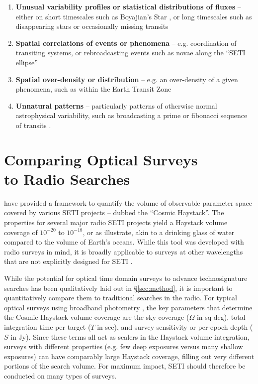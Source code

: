 \documentclass[twocolumn]{aastex62}
\begin{document}
\begin{enumerate}
\item {\bf Unusual variability profiles or statistical distributions of fluxes }-- either on short timescales such as Boyajian's Star \citep{boyajian2015}, or long timescales such as disappearing stars \citep{villarroel2016} or occasionally missing transits \citep{kipping2016}
%
\item {\bf Spatial correlations of events or phenomena }-- e.g. coordination of transiting systems, or rebroadcasting events such as novae along the ``SETI ellipse'' \citep{makovetskii1977,lemarchand1994,tarter2001,shostak2004}
%
\item {\bf Spatial over-density or distribution} -- e.g. an over-density of a given phenomena, such as within the Earth Transit Zone \citep{heller2016}
%
\item {\bf Unnatural patterns} -- particularly patterns of otherwise normal astrophysical variability, such as broadcasting a prime or fibonacci sequence of transits \citep{wright2016}.
%
\end{enumerate}




\section{Comparing Optical Surveys\\ to Radio Searches}
\label{sec:haystack}

\citet{wright2018c} have provided a framework to quantify the volume of observable parameter space covered by various SETI projects -- dubbed the ``Cosmic Haystack''. The properties for several major radio SETI projects yield a Haystack volume coverage of $10^{-20}$ to $10^{-18}$, or as \citet{wright2018c} illustrate, akin to a drinking glass of water compared to the volume of Earth's oceans. While this tool was developed with radio surveys in mind, it is broadly applicable to surveys at other wavelengths that are not explicitly designed for SETI \citep[e.g. see][]{forgan2019}.


While the potential for optical time domain surveys to advance technosignature searches has been qualitatively laid out in \S\ref{sec:method}, it is important to quantitatively compare them to traditional searches in the radio. 
For typical optical surveys using broadband photometry \citep{djorgovski2013}, the key parameters that determine the Cosmic Haystack volume coverage are the sky coverage ($\Omega$ in sq deg), total integration time per target ($T$ in sec), and survey sensitivity or per-epoch depth ($S$ in Jy).
Since these terms all act as scalers in the Haystack volume integration, surveys with different properties (e.g. few deep exposures versus many shallow exposures) can have comparably large Haystack coverage, filling out very different portions of the search volume. For maximum impact, SETI should therefore be conducted on many types of surveys.
\end{document}

